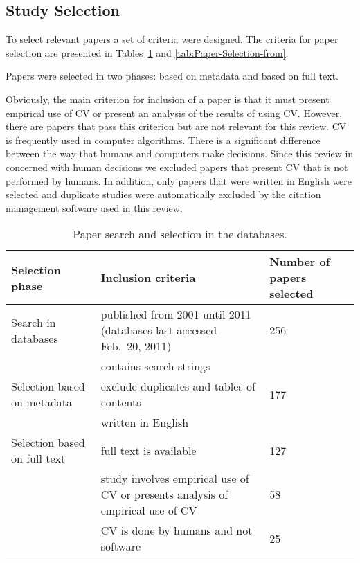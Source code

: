 \subsection{Study Selection}
To select relevant papers a set of criteria were designed. The criteria for paper selection are presented in Tables~\ref{tab:Paper-search-and} and \ref{tab:Paper-Selection-from}.

Papers were selected in two phases: based on metadata and based on full text.

Obviously, the main criterion for inclusion of a paper is that it must present empirical use of CV or present an analysis of the results of using CV. However, there are papers that pass this criterion but are not relevant for this review. CV is frequently used in computer algorithms. There is a significant difference between the way that humans and computers make decisions. Since this review in concerned with human decisions we excluded papers that present CV that is not performed by humans. In addition, only papers that were written in English were selected and duplicate studies were automatically excluded by the citation management software used in this review.


\begin{table}
	\scriptsize
\caption{\label{tab:Paper-search-and}Paper search and selection in the databases.}

\begin{tabular}{|>{\raggedright}p{}|>{\raggedright}p{}|>{\raggedright}p{}|}
\hline
Selection phase & Inclusion criteria & Number of papers selected\tabularnewline
\hline \hline

Search in databases & published from 2001 until 2011 (databases last accessed Feb.\ 20, 2011) & 256 \tabularnewline
\cline{2-2}
& contains search strings & \tabularnewline
\hline 

Selection based on metadata & exclude duplicates and tables of contents& 177 \tabularnewline
\cline{2-2}
&  written in English  & \tabularnewline
\hline

Selection based on full text & full text is available & 127 \tabularnewline
\cline{2-3}
& study involves empirical use of CV or presents analysis of empirical use of CV & 58 \tabularnewline
\cline{2-3}
& CV is done by humans and not software & 25 \tabularnewline
\hline
\end{tabular}%
\end{table}

